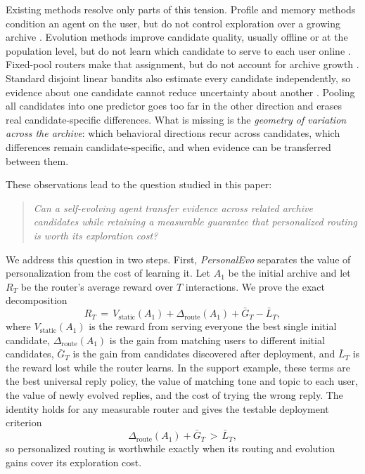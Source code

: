 \documentclass{article} %
\begin{document}
Existing methods resolve only parts of this tension. Profile and memory methods condition an agent on the user, but do not control exploration over a growing archive \citep{salemi2023lamp,jin2026personalizing,zhang2025personaagent,westhausser2025persistent}. Evolution methods improve candidate quality, usually offline or at the population level, but do not learn which candidate to serve to each user online \citep{fernando2023promptbreeder,guo2024evoprompt,zhou2024symbolic,agrawal2025geparp}. Fixed-pool routers make that assignment, but do not account for archive growth \citep{ong2024routellm,li2025llmbandit,tsai2026neuralucb}. Standard disjoint linear bandits also estimate every candidate independently, so evidence about one candidate cannot reduce uncertainty about another \citep{li2010contextual,chu2011linucb}. Pooling all candidates into one predictor goes too far in the other direction and erases real candidate-specific differences. What is missing is the \emph{geometry of variation across the archive}: which behavioral directions recur across candidates, which differences remain candidate-specific, and when evidence can be transferred between them.

These observations lead to the question studied in this paper:
\begin{quote}
\emph{Can a self-evolving agent transfer evidence across related archive candidates while retaining a measurable guarantee that personalized routing is worth its exploration cost?}
\end{quote}

We address this question in two steps. First, \emph{PersonalEvo} separates the value of personalization from the cost of learning it. Let $A_1$ be the initial archive and let $R_T$ be the router's average reward over $T$ interactions. We prove the exact decomposition
\begin{equation}
\label{eq:intro-decomp}
R_T
\,=\,
V_{\mathrm{static}}(A_1)
+
\Delta_{\mathrm{route}}(A_1)
+
\bar G_T
-
\bar L_T ,
\end{equation}
where $V_{\mathrm{static}}(A_1)$ is the reward from serving everyone the best single initial candidate, $\Delta_{\mathrm{route}}(A_1)$ is the gain from matching users to different initial candidates, $\bar G_T$ is the gain from candidates discovered after deployment, and $\bar L_T$ is the reward lost while the router learns. In the support example, these terms are the best universal reply policy, the value of matching tone and topic to each user, the value of newly evolved replies, and the cost of trying the wrong reply. The identity holds for any measurable router and gives the testable deployment criterion
\begin{equation}
\label{eq:intro-dominance}
\Delta_{\mathrm{route}}(A_1) + \bar G_T \,>\, \bar L_T ,
\end{equation}
so personalized routing is worthwhile exactly when its routing and evolution gains cover its exploration cost.
\end{document}
